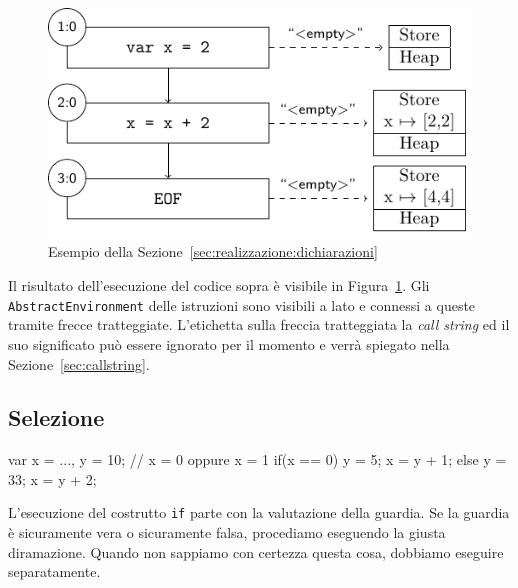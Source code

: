 \begin{figure}[htbp]
    \centering
    \includegraphics{scheme-generator/generated/example-declaration.pdf}
    \caption{Esempio della Sezione~\ref{sec:realizzazione:dichiarazioni}}
    \label{fig:realizzazione:dichiarazioni}
\end{figure}

Il risultato dell'esecuzione del codice sopra è visibile in Figura~\ref{fig:realizzazione:dichiarazioni}. Gli \texttt{AbstractEnvironment} delle istruzioni sono visibili a lato e connessi a queste tramite frecce tratteggiate. L'etichetta sulla freccia tratteggiata la \emph{call string} ed il suo significato può essere ignorato per il momento e verrà spiegato nella Sezione~\ref{sec:callstring}.

\subsection{Selezione}\label{sec:realizzazione:selezione}
\begin{javascriptcode}
var x = ..., y = 10; // x = 0 oppure x = 1
if(x == 0) {
    y = 5;
    x = y + 1;
} else {
    y = 33;
    x = y + 2;
}
\end{javascriptcode}
L'esecuzione del costrutto \texttt{if} parte con la valutazione della guardia. Se la guardia è sicuramente vera o sicuramente falsa, procediamo eseguendo la giusta diramazione. Quando non sappiamo con certezza questa cosa, dobbiamo eseguire separatamente.

